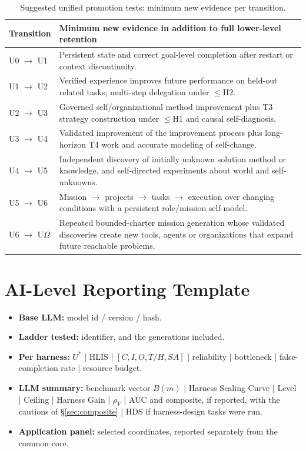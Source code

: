 \documentclass[11pt]{article}
\theoremstyle{definition}
\newcommand{\Om}{\ensuremath{\Omega}}
\newcommand{\rhov}{\ensuremath{\rho_V}}
\begin{document}
\begin{table}[!htbp]
\centering\small
\begin{tabularx}{\textwidth}{@{}lY@{}}
\toprule
Transition & Minimum new evidence in addition to full lower-level retention \\
\midrule
U0 $\to$ U1 & Persistent state and correct goal-level completion after restart or context discontinuity. \\
U1 $\to$ U2 & Verified experience improves future performance on held-out related tasks; multi-step delegation under $\le$H2. \\
U2 $\to$ U3 & Governed self/organizational method improvement plus T3 strategy construction under $\le$H1 and causal self-diagnosis. \\
U3 $\to$ U4 & Validated improvement of the improvement process plus long-horizon T4 work and accurate modeling of self-change. \\
U4 $\to$ U5 & Independent discovery of initially unknown solution method or knowledge, and self-directed experiments about world and self-unknowns. \\
U5 $\to$ U6 & Mission $\to$ projects $\to$ tasks $\to$ execution over changing conditions with a persistent role/mission self-model. \\
U6 $\to$ U\Om{} & Repeated bounded-charter mission generation whose validated discoveries create new tools, agents or organizations that expand future reachable problems. \\
\bottomrule
\end{tabularx}
\caption{Suggested unified promotion tests: minimum new evidence per transition.}
\label{tab:promotion}
\end{table}

\section{AI-Level Reporting Template}

\begin{itemize}
\item \textbf{Base LLM:} model id / version / hash.
\item \textbf{Ladder tested:} identifier, and the generations included.
\item \textbf{Per harness:} $U^{*}$ | HLIS | $[C,I,O,T/H,SA]$ | reliability | bottleneck | false-completion rate | resource budget.
\item \textbf{LLM summary:} benchmark vector $B(m)$ | Harness Scaling Curve | Level | Ceiling | Harness Gain | \rhov{} | AUC and composite, if reported, with the cautions of \S\ref{sec:composite} | HDS if harness-design tasks were run.
\item \textbf{Application panel:} selected coordinates, reported separately from the common core.
\end{itemize}
\end{document}
